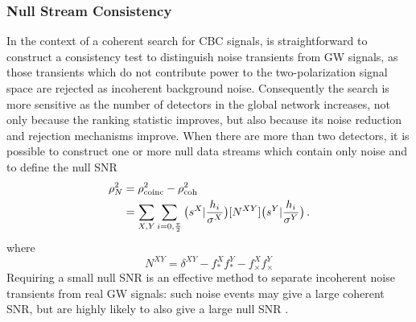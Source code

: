 \documentclass[binding=0.6cm, LaM]{sapthesis}
\begin{document}
\subsubsection{Null Stream Consistency}
\label{subsubsec:nullsnr}
	In the context of a coherent search for CBC signals,
	is straightforward to construct a consistency test to distinguish noise transients from GW signals,
	as those transients which do not contribute power to the two-polarization signal space are rejected as incoherent background noise. 
	Consequently the search is more sensitive as the number of detectors in the global network increases, 
	not only because the ranking statistic improves, but also because its noise reduction and rejection mechanisms improve. 
	When there are more than two detectors, it is possible to construct one or more null data streams 
	which contain only noise and to define the null SNR 
                \begin{align}
                        \rho^2_N &= \rho^2_{\rm coinc} - \rho^2_{\rm coh} \\
					&= \sum_{X,Y}\sum_{i=0,{{\pi}\over{2}}}  \big(s^X|{{h_i}\over{\sigma^X}}\big)[N^{XY}]\big( s^Y|{{h_i}\over{\sigma^Y}}\big)\,. 
                \end{align}
	where
                \begin{equation}
			N^{XY} = \delta^{XY}-f^X_*f^Y_* - f^X_{\times}f^Y_{\times}
                \end{equation}
	Requiring a small null SNR is an effective method to separate incoherent noise transients from real GW signals: 
	such noise events may give a large coherent SNR, but are highly likely to also give a large null SNR \cite{45}.
\end{document}
